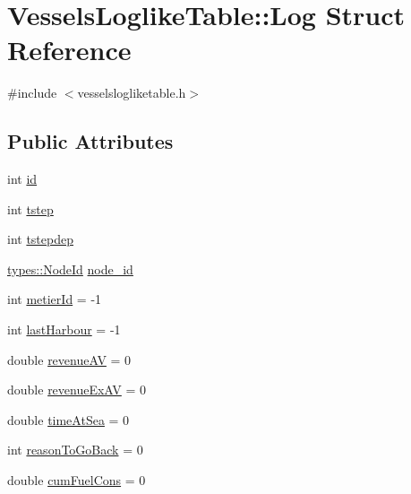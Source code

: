 \hypertarget{struct_vessels_loglike_table_1_1_log}{}\section{Vessels\+Loglike\+Table\+::Log Struct Reference}
\label{struct_vessels_loglike_table_1_1_log}


{\ttfamily \#include $<$vesselslogliketable.\+h$>$}

\subsection*{Public Attributes}
\begin{DoxyCompactItemize}
\item 
int \mbox{\hyperlink{struct_vessels_loglike_table_1_1_log_a602479400ebc2081eb65bfdb8541fd58}{id}}
\item 
int \mbox{\hyperlink{struct_vessels_loglike_table_1_1_log_a2f7ef286e4e46893ece18bafcf281075}{tstep}}
\item 
int \mbox{\hyperlink{struct_vessels_loglike_table_1_1_log_ac0aee318df7e540c7ee6ea308405c728}{tstepdep}}
\item 
\mbox{\hyperlink{classtypes_1_1_node_id}{types\+::\+Node\+Id}} \mbox{\hyperlink{struct_vessels_loglike_table_1_1_log_a37c7fc4f6dae6d8300d99a92f57957bf}{node\+\_\+id}}
\item 
int \mbox{\hyperlink{struct_vessels_loglike_table_1_1_log_a330b14c7d0a162d22a7eae620a51fad0}{metier\+Id}} = -\/1
\item 
int \mbox{\hyperlink{struct_vessels_loglike_table_1_1_log_a3d00ef801dcb99be0610539570e243a7}{last\+Harbour}} = -\/1
\item 
double \mbox{\hyperlink{struct_vessels_loglike_table_1_1_log_a81839c4390abb25a29d7639e5f325a51}{revenue\+AV}} = 0
\item 
double \mbox{\hyperlink{struct_vessels_loglike_table_1_1_log_ae14271c89f66b5d5c868a15b124e1aa3}{revenue\+Ex\+AV}} = 0
\item 
double \mbox{\hyperlink{struct_vessels_loglike_table_1_1_log_abc8db6c4fa1c6351fd8ae0548869e73e}{time\+At\+Sea}} = 0
\item 
int \mbox{\hyperlink{struct_vessels_loglike_table_1_1_log_a0cdcab3833b6508d8e7a02910cd1249f}{reason\+To\+Go\+Back}} = 0
\item 
double \mbox{\hyperlink{struct_vessels_loglike_table_1_1_log_a6465c1acb53c075768db16d921b0900a}{cum\+Fuel\+Cons}} = 0
\item 

\end{DoxyCompactItemize}
